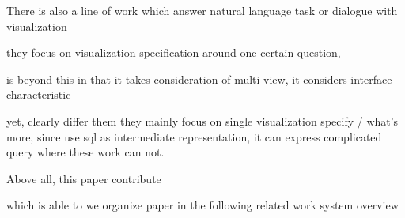 There is also a line of work which answer natural language task or dialogue  with visualization 

they focus on visualization specification around one certain question, 

\sys is beyond this in that it takes consideration of multi view, it considers interface characteristic 

yet, \sys clearly differ them they mainly focus on single visualization specify /  what's more, since \sys use sql \difftree as intermediate representation, it can express complicated query where these work can not. 



Above all, this paper contribute \sys 

which is able to  
we organize paper in the following 
related work 
system overview 




